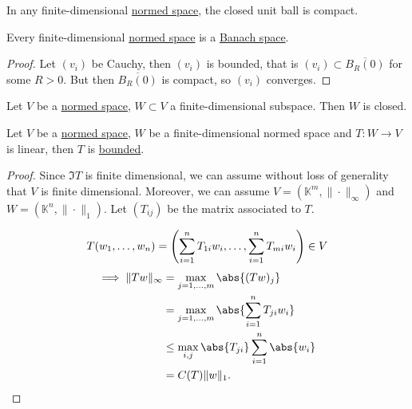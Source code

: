 \documentclass{article}
\newcommand{\K}{\mathbb{K}}
\begin{document}
\begin{cor}
    In any finite-dimensional \hyperlink{def:nvs}{normed space}, the closed unit ball is compact.
\end{cor}

\begin{cor}
    Every finite-dimensional \hyperlink{def:nvs}{normed space} is a \hyperlink{def:banach}{Banach space}.
\end{cor}

\begin{proof}
    Let $(v_i)$ be Cauchy, then $(v_i)$ is bounded, that is $(v_i) \subset \overline{B_R(0)}$ for some $R > 0$. But then $\overline{B_R(0)}$ is compact, so $(v_i)$ converges.
\end{proof}

\begin{cor}
    Let $V$ be a \hyperlink{def:nvs}{normed space}, $W \subset V$ a finite-dimensional subspace. Then $W$ is closed.
\end{cor}

\begin{cor}
    Let $V$ be a \hyperlink{def:nvs}{normed space}, $W$ be a finite-dimensional normed space and $T: W \to V$ is linear, then $T$ is \hyperlink{def:boundedLinearMap}{bounded}.
\end{cor}

\begin{proof}
    Since $\Im T$ is finite dimensional, we can assume without loss of generality that $V$ is finite dimensional.
    Moreover, we can assume $V = (\K^m, \|\cdot\|_\infty)$ and $W = (\K^n, \|\cdot\|_1)$.
    Let $(T_{ij})$ be the matrix associated to $T$.

    \begin{equation*}
        T(w_1, \dotsc, w_n)= \left(\sum_{i=1}^n T_{1i} w_i, \dotsc, \sum_{i=1}^n T_{mi} w_i\right) \in V \\
    \end{equation*}
    \begin{align*}
        \implies \|Tw\|_\infty &= \max_{j = 1, \dotsc, m} \abs{(Tw)_j} \\
                                  &= \max_{j = 1, \dotsc, m} \abs{\sum_{i=1}^n T_{ji} w_i} \\
                                  &\leq \max_{i,j} \abs{T_{ji}} \sum_{i=1}^n \abs{w_i} \\
                                  &= C(T) \|w\|_1. \qedhere
    \end{align*}
\end{proof}
\end{document}
